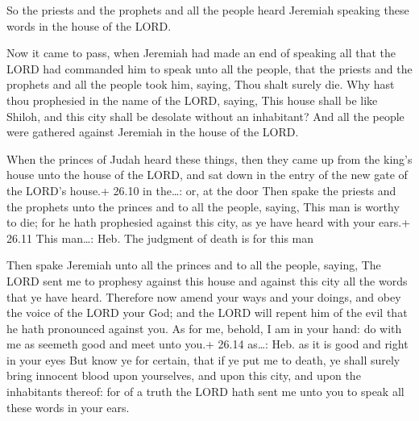  So the priests and the prophets and all the people heard
Jeremiah speaking these words in the house of the LORD.

 Now it came to pass, when Jeremiah had made an end of
speaking all that the LORD had commanded him to speak unto all the
people, that the priests and the prophets and all the people took him,
saying, Thou shalt surely die.  Why hast thou prophesied in
the name of the LORD, saying, This house shall be like Shiloh, and this
city shall be desolate without an inhabitant? And all the people were
gathered against Jeremiah in the house of the LORD.

 When the princes of Judah heard these things, then they
came up from the king's house unto the house of the LORD, and sat down
in the entry of the new gate of the LORD's house.+ 26.10 in the\ldots:
or, at the door  Then spake the priests and the prophets
unto the princes and to all the people, saying, This man is worthy to
die; for he hath prophesied against this city, as ye have heard with
your ears.+ 26.11 This man\ldots: Heb. The judgment of death is for this
man

 Then spake Jeremiah unto all the princes and to all the
people, saying, The LORD sent me to prophesy against this house and
against this city all the words that ye have heard. 
Therefore now amend your ways and your doings, and obey the voice of the
LORD your God; and the LORD will repent him of the evil that he hath
pronounced against you.  As for me, behold, I am in your
hand: do with me as seemeth good and meet unto you.+ 26.14 as\ldots:
Heb. as it is good and right in your eyes  But know ye for
certain, that if ye put me to death, ye shall surely bring innocent
blood upon yourselves, and upon this city, and upon the inhabitants
thereof: for of a truth the LORD hath sent me unto you to speak all
these words in your ears.

